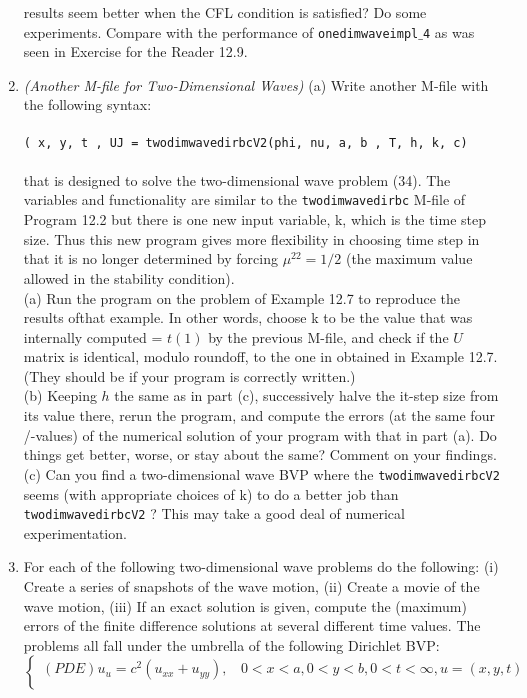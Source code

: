 \documentclass[../main.tex]{subfiles}
\begin{document}
\begin{enumerate}
results seem better when the CFL condition is satisfied? Do some experiments. Compare with 
the performance of \texttt{onedimwaveimpl$\_$4} as was seen in Exercise for the Reader 12.9. 
	\item 
		\textit{(Another M-file for Two-Dimensional Waves)} (a) Write another M-file with the following 
syntax: 
\\
\\
	\texttt{( x, y, t , UJ = twodimwavedirbcV2(phi, nu, a, b , T, h, k, c) }
\\
\\
that is designed to solve the two-dimensional wave problem (34). The variables and functionality are similar to the \texttt{twodimwavedirbc} M-file of Program 12.2 but there is one new input variable, k, which is the time step size. Thus this new program gives more flexibility in choosing time step in that it is no longer determined by forcing $\mu ^22 =1/2$ (the maximum value allowed in the stability condition). 
\\
(a) Run the program on the problem of Example 12.7 to reproduce the results ofthat example. In other words, choose k to be the value that was internally computed = $t(1)$ by the previous M-file, and check if the $U$ matrix is identical, modulo roundoff, to the one in obtained in Example 12.7. (They should be if your program is correctly written.) 
\\
(b) Keeping $h$ the same as in part (c), successively halve the it-step size from its value there, rerun the program, and compute the errors (at the same four /-values) of the numerical solution of your program with that in part (a). Do things get better, worse, or stay about the same? Comment on your findings. 
\\
(c) Can you find a two-dimensional wave BVP where the \texttt{twodimwavedirbcV2} seems (with appropriate choices of k) to do a better job than \texttt{twodimwavedirbcV2} ? This may take a good deal of numerical experimentation.
	\item
		For each of the following two-dimensional wave problems do the following: (i) Create a series of snapshots of the wave motion, (ii) Create a movie of the 	wave motion, (iii) If an exact solution is given, compute the (maximum) errors of the finite difference solutions at several different time values. The problems all fall under the umbrella of the following Dirichlet BVP: 
$$	\begin{cases} 
	(PDE) u_u=c^2 (u_{xx}+u_{yy}),~~~~0<x<a, 0<y<b,0<t<\infty,u=(x,y,t)\\

\end{cases}$$
\end{enumerate}
\end{document}
